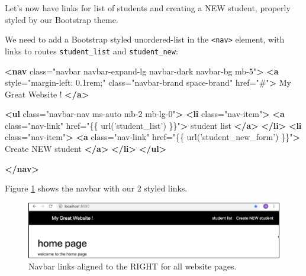 \documentclass[a4paperpaper,openright]{book}
\newenvironment{Shaded}{}{}
\newcommand{\KeywordTok}[1]{\textcolor[rgb]{0.00,0.44,0.13}{\textbf{#1}}}
\newcommand{\NormalTok}[1]{#1}
\newcommand{\OtherTok}[1]{\textcolor[rgb]{0.00,0.44,0.13}{#1}}
\newcommand{\StringTok}[1]{\textcolor[rgb]{0.25,0.44,0.63}{#1}}
\begin{document}
Let's now have links for list of students and creating a NEW student,
properly styled by our Bootstrap theme.

We need to add a Bootstrap styled unordered-list in the
\texttt{\textless{}nav\textgreater{}} element, with links to routes
\texttt{student\_list} and \texttt{student\_new}:

\begin{Shaded}
\begin{Highlighting}[]
        \KeywordTok{<nav}\OtherTok{ class=}\StringTok{"navbar navbar-expand-lg navbar-dark navbar-bg mb-5"}\KeywordTok{>}
            \KeywordTok{<a}\OtherTok{ style=}\StringTok{"margin-left: 0.1rem;"}\OtherTok{ class=}\StringTok{"navbar-brand space-brand"}\OtherTok{ href=}\StringTok{"#"}\KeywordTok{>}
\NormalTok{                My Great Website !}
            \KeywordTok{</a>}

            \KeywordTok{<ul}\OtherTok{ class=}\StringTok{"navbar-nav ms-auto mb-2 mb-lg-0"}\KeywordTok{>}
                \KeywordTok{<li}\OtherTok{ class=}\StringTok{"nav-item"}\KeywordTok{>}
                    \KeywordTok{<a}\OtherTok{ class=}\StringTok{"nav-link"}\OtherTok{ href=}\StringTok{"\{\{ url('student_list') \}\}"}\KeywordTok{>}
\NormalTok{                        student list}
                    \KeywordTok{</a>}
                \KeywordTok{</li>}
                \KeywordTok{<li}\OtherTok{ class=}\StringTok{"nav-item"}\KeywordTok{>}
                    \KeywordTok{<a}\OtherTok{ class=}\StringTok{"nav-link"}\OtherTok{ href=}\StringTok{"\{\{ url('student_new_form') \}\}"}\KeywordTok{>}
\NormalTok{                        Create NEW student}
                    \KeywordTok{</a>}
                \KeywordTok{</li>}
            \KeywordTok{</ul>}
     
        \KeywordTok{</nav>}
\end{Highlighting}
\end{Shaded}

Figure \ref{styled_links} shows the navbar with our 2 styled links.

\begin{figure}
\centering
\includegraphics{./tex2pdf.-8a1528da847c818a/7ce4ab3158613594bcaaa31601e404c70d3d4ed4.png}
\caption{Navbar links aligned to the RIGHT for all website pages.
\label{styled_links}}
\end{figure}
\end{document}
